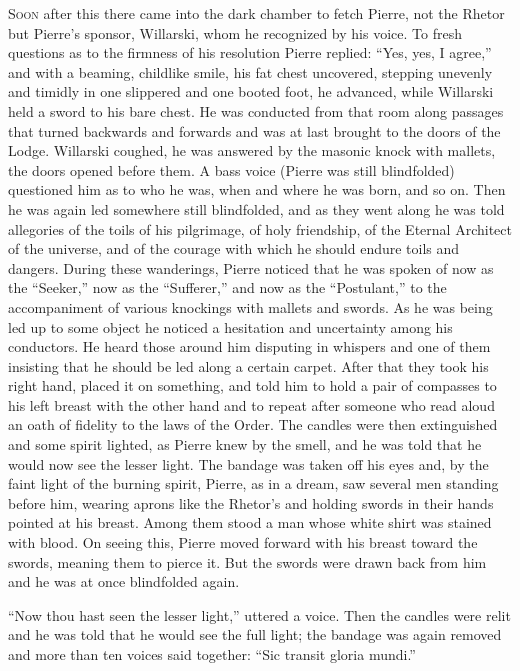 \lettrine[lines=2, loversize=0.3, lraise=0]{\initfamily S}{oon}
after this there came into the dark chamber to fetch Pierre,
not the Rhetor but Pierre's sponsor, Willarski, whom he
recognized by his voice. To fresh questions as to the firmness of
his resolution Pierre replied: ``Yes, yes, I agree,'' and with a
beaming, childlike smile, his fat chest uncovered, stepping
unevenly and timidly in one slippered and one booted foot, he
advanced, while Willarski held a sword to his bare chest. He was
conducted from that room along passages that turned backwards and
forwards and was at last brought to the doors of the
Lodge. Willarski coughed, he was answered by the masonic knock
with mallets, the doors opened before them. A bass voice (Pierre
was still blindfolded) questioned him as to who he was, when and
where he was born, and so on. Then he was again led somewhere
still blindfolded, and as they went along he was told allegories
of the toils of his pilgrimage, of holy friendship, of the
Eternal Architect of the universe, and of the courage with which
he should endure toils and dangers. During these wanderings,
Pierre noticed that he was spoken of now as the ``Seeker,'' now
as the ``Sufferer,'' and now as the ``Postulant,'' to the
accompaniment of various knockings with mallets and swords. As he
was being led up to some object he noticed a hesitation and
uncertainty among his conductors. He heard those around him
disputing in whispers and one of them insisting that he should be
led along a certain carpet.  After that they took his right hand,
placed it on something, and told him to hold a pair of compasses
to his left breast with the other hand and to repeat after
someone who read aloud an oath of fidelity to the laws of the
Order. The candles were then extinguished and some spirit
lighted, as Pierre knew by the smell, and he was told that he
would now see the lesser light. The bandage was taken off his
eyes and, by the faint light of the burning spirit, Pierre, as in
a dream, saw several men standing before him, wearing aprons like
the Rhetor's and holding swords in their hands pointed at his
breast. Among them stood a man whose white shirt was stained with
blood. On seeing this, Pierre moved forward with his breast
toward the swords, meaning them to pierce it.  But the swords
were drawn back from him and he was at once blindfolded again.

``Now thou hast seen the lesser light,'' uttered a voice. Then
the candles were relit and he was told that he would see the full
light; the bandage was again removed and more than ten voices
said together: ``Sic transit gloria mundi.''


